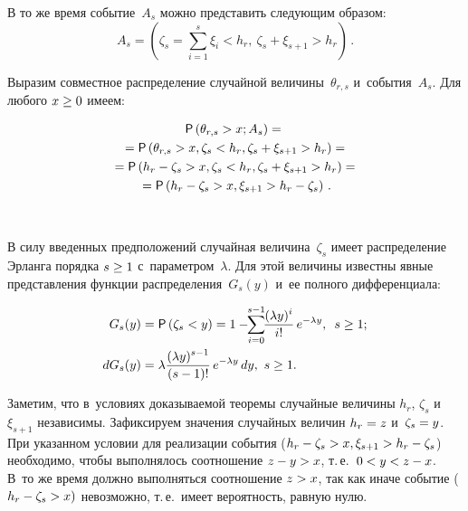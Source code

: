 \begin{multicols}{2}
  В то же время событие~$A_s$ можно пред\-ста\-вить сле\-ду\-ющим образом:
    $$
  A_s=\left( \zeta_s=\sum\limits^s_{i=1} \xi_i< h_r,\ \zeta_s+\xi_{s+1}>h_r\right)\,.
  $$
  
  Выразим совместное распределение случайной величины~$\theta_{r,s}$ 
и~события~$A_s$. Для любого $x\hm\geq 0$ имеем:

\vspace*{-2pt}

\noindent
  \begin{multline}
  {\sf P}\left( \theta_{r,s}>x;A_s\right) ={}\\
  {}={\sf P}\left( \theta_{r,s}>x, \zeta_s<h_r, \zeta_s+ 
\xi_{s+1}>h_r\right)={}\\
  {}={\sf P}\left( h_r-\zeta_s>x, \zeta_s<h_r, \zeta_s+\xi_{s+1}>h_r\right) ={}\\
  {}= {\sf P}\left( h_r-
\zeta_s>x, \xi_{s+1}>h_r-\zeta_s\right)\,.
  \label{e5-sn}
  \end{multline}
  
    \begin{figure*} %
  \vspace*{1pt}
    \begin{center}  
  \mbox{%
 \epsfxsize=106.27mm 
 }
\end{center}
\vspace*{-15pt}
  \end{figure*}
  
  В силу введенных предположений случайная величина~$\zeta_s$ имеет 
рас\-пре\-де\-ле\-ние Эр\-лан\-га порядка $s\hm\geq 1$ с~па\-ра\-мет\-ром~$\lambda$. Для 
этой величины известны явные пред\-став\-ле\-ния функции 
рас\-пре\-де\-ле\-ния~$G_s(y)$ и~ее полного дифференциала:

\pagebreak

\noindent
  \begin{align*}
  G_s(y)&= {\sf P}\left( \zeta_s<y\right) =1-\!\!\sum\limits_{i=0}^{s-1}\!\! \displaystyle\frac{\displaystyle (\lambda 
y)^i\mathstrut}{\displaystyle i!\mathstrut}\,e^{-\lambda y},\enskip s\geq 1;\\
  dG_s(y)&= \lambda \displaystyle\frac{\displaystyle (\lambda y)^{s-1}\mathstrut}{\displaystyle (s-1)!\mathstrut}\,e^{-\lambda y}\,dy,\   
s\geq 1.
  \end{align*}
  
  Заметим, что в~условиях доказываемой тео\-ре\-мы случайные величины $h_r$, 
$\zeta_s$ и~$\xi_{s+1}$ независимы. Зафиксируем значения случайных величин 
$h_r\hm= z$ и~$\zeta_s\hm=y$. При указанном условии для реализации события 
($h_r\hm-\zeta_s\hm> x, \xi_{s+1}\hm>h_r\hm-\zeta_s$) необходимо, чтобы 
выполнялось соотношение $z\hm-y\hm>x$, т.\,е.\ $0\hm<y\hm<z\hm-x$. В~то же 
время должно выполняться соотношение $z\hm>x$, так как иначе событие 
($h_r\hm- \zeta_s\hm>x)$ невозможно, т.\,е.\ имеет ве\-ро\-ят\-ность, рав\-ную нулю.
  

\end{multicols}
